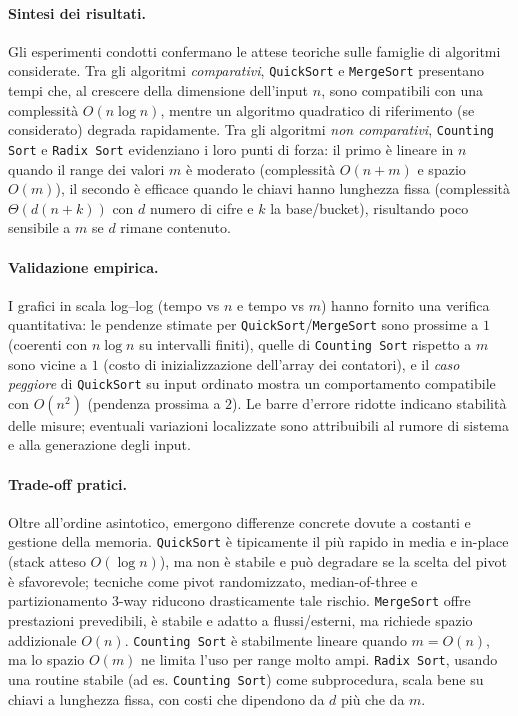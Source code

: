 \documentclass[a4paper, 11pt]{article}
\begin{document}
\paragraph{Sintesi dei risultati.}
Gli esperimenti condotti confermano le attese teoriche sulle famiglie di algoritmi considerate. 
Tra gli algoritmi \emph{comparativi}, \texttt{QuickSort} e \texttt{MergeSort} presentano tempi che, al crescere della dimensione dell'input \(n\), sono compatibili con una complessità \(O(n\log n)\), mentre un algoritmo quadratico di riferimento (se considerato) degrada rapidamente. 
Tra gli algoritmi \emph{non comparativi}, \texttt{Counting Sort} e \texttt{Radix Sort} evidenziano i loro punti di forza: il primo è lineare in \(n\) quando il range dei valori \(m\) è moderato (complessità \(O(n+m)\) e spazio \(O(m)\)), il secondo è efficace quando le chiavi hanno lunghezza fissa (complessità \(\Theta(d(n+k))\) con \(d\) numero di cifre e \(k\) la base/bucket), risultando poco sensibile a \(m\) se \(d\) rimane contenuto.

\paragraph{Validazione empirica.}
I grafici in scala log--log (tempo vs \(n\) e tempo vs \(m\)) hanno fornito una verifica quantitativa: 
le pendenze stimate per \texttt{QuickSort}/\texttt{MergeSort} sono prossime a \(1\) (coerenti con \(n\log n\) su intervalli finiti), 
quelle di \texttt{Counting Sort} rispetto a \(m\) sono vicine a \(1\) (costo di inizializzazione dell'array dei contatori), 
e il \emph{caso peggiore} di \texttt{QuickSort} su input ordinato mostra un comportamento compatibile con \(O(n^2)\) (pendenza prossima a \(2\)). 
Le barre d'errore ridotte indicano stabilità delle misure; eventuali variazioni localizzate sono attribuibili al rumore di sistema e alla generazione degli input.

\paragraph{Trade-off pratici.}
Oltre all'ordine asintotico, emergono differenze concrete dovute a costanti e gestione della memoria. 
\texttt{QuickSort} è tipicamente il più rapido in media e in-place (stack atteso \(O(\log n)\)), ma non è stabile e può degradare se la scelta del pivot è sfavorevole; tecniche come pivot randomizzato, median-of-three e partizionamento 3-way riducono drasticamente tale rischio. 
\texttt{MergeSort} offre prestazioni prevedibili, è stabile e adatto a flussi/esterni, ma richiede spazio addizionale \(O(n)\). 
\texttt{Counting Sort} è stabilmente lineare quando \(m=O(n)\), ma lo spazio \(O(m)\) ne limita l'uso per range molto ampi. 
\texttt{Radix Sort}, usando una routine stabile (ad es. \texttt{Counting Sort}) come subprocedura, scala bene su chiavi a lunghezza fissa, con costi che dipendono da \(d\) più che da \(m\).
\end{document}

